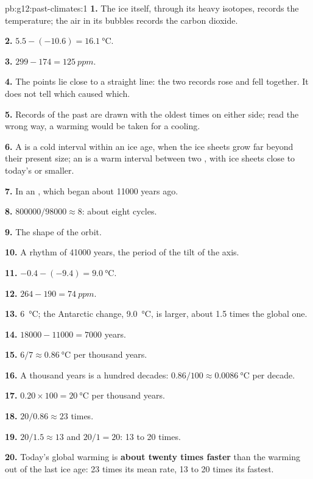 \begin{solution}{pb:g12:past-climates:1}
\textbf{1.} The ice itself, through its heavy isotopes, records the
temperature; the air in its bubbles records the carbon dioxide.

\textbf{2.} $5.5 - (-10.6) = \qty{16.1}{\degreeCelsius}$.

\textbf{3.} $299 - 174 = \qty{125}{ppm}$.

\textbf{4.} The points lie close to a straight line: the two records rose
and fell together. It does not tell which caused which.

\textbf{5.} Records of the past are drawn with the oldest times on either
side; read the wrong way, a warming would be taken for a cooling.

\textbf{6.} A  is a cold interval within an ice age, when the
ice sheets grow far beyond their present size; an  is a warm
interval between two , with ice sheets close to today's or
smaller.

\textbf{7.} In an , which began about \num{11000} years ago.

\textbf{8.} $\num{800000}/\num{98000} \approx 8$: about eight cycles.

\textbf{9.} The shape of the orbit.

\textbf{10.} A rhythm of \num{41000} years, the period of the tilt of the
axis.

\textbf{11.} $-0.4 - (-9.4) = \qty{9.0}{\degreeCelsius}$.

\textbf{12.} $264 - 190 = \qty{74}{ppm}$.

\textbf{13.} \qty{6}{\degreeCelsius}; the Antarctic change, \qty{9.0}{\degreeCelsius},
is larger, about 1.5 times the global one.

\textbf{14.} $\num{18000} - \num{11000} = \num{7000}$ years.

\textbf{15.} $6/7 \approx \qty{0.86}{\degreeCelsius}$ per thousand years.

\textbf{16.} A thousand years is a hundred decades: $0.86/100 \approx
\qty{0.0086}{\degreeCelsius}$ per decade.

\textbf{17.} $0.20 \times 100 = \qty{20}{\degreeCelsius}$ per thousand years.

\textbf{18.} $20/0.86 \approx 23$ times.

\textbf{19.} $20/1.5 \approx 13$ and $20/1 = 20$: 13 to 20 times.

\textbf{20.} Today's global warming is \textbf{about twenty times faster} than
the warming out of the last ice age: 23 times its mean rate, 13 to 20 times
its fastest.
\end{solution}
